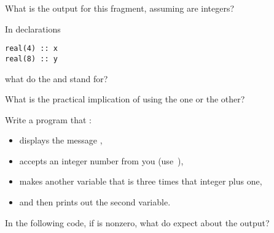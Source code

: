 \begin{exercise}
  What is the output for this fragment, assuming  are integers?
\end{exercise}

\begin{exercise}
  \label{ex:f-elt-rev1}
  In declarations
\begin{lstlisting}
real(4) :: x
real(8) :: y
\end{lstlisting}
what do the  and  stand for?

What is the practical implication of using the one or the other?
\end{exercise}

\begin{exercise}
  \label{ex:read-writet3np1}
  Write a program that :
  \begin{itemize}
  \item displays the message ,
  \item accepts an integer number from you (use~),
  \item makes another variable that is three times that integer plus one,
  \item and then prints out the second variable.
  \end{itemize}
\end{exercise}

\begin{exercise}
  \label{ex:f-elt-rev2}
  In the following code, if  is nonzero, what do expect about
  the output?
\end{exercise}
